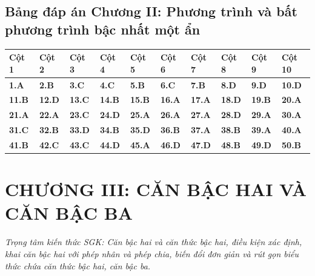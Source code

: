 \documentclass[11pt,a4paper]{article}
\begin{document}
\subsection*{\color{primary} Bảng đáp án Chương II: Phương trình và bất phương trình bậc nhất một ẩn}
\begin{center}
\renewcommand{\arraystretch}{1.25}
\begin{tabularx}{\textwidth}{*{10}{>{\centering\arraybackslash}X}}
\toprule
\textbf{\color{primary} Cột 1} & \textbf{\color{primary} Cột 2} & \textbf{\color{primary} Cột 3} & \textbf{\color{primary} Cột 4} & \textbf{\color{primary} Cột 5} & \textbf{\color{primary} Cột 6} & \textbf{\color{primary} Cột 7} & \textbf{\color{primary} Cột 8} & \textbf{\color{primary} Cột 9} & \textbf{\color{primary} Cột 10} \\
\midrule
\textbf{1.A} & \textbf{2.B} & \textbf{3.C} & \textbf{4.C} & \textbf{5.B} & \textbf{6.C} & \textbf{7.B} & \textbf{8.D} & \textbf{9.D} & \textbf{10.D} \\
\rowcolor{rowtint} \textbf{11.B} & \textbf{12.D} & \textbf{13.C} & \textbf{14.B} & \textbf{15.B} & \textbf{16.A} & \textbf{17.A} & \textbf{18.D} & \textbf{19.B} & \textbf{20.A} \\
\textbf{21.A} & \textbf{22.A} & \textbf{23.C} & \textbf{24.D} & \textbf{25.A} & \textbf{26.A} & \textbf{27.A} & \textbf{28.D} & \textbf{29.A} & \textbf{30.A} \\
\rowcolor{rowtint} \textbf{31.C} & \textbf{32.B} & \textbf{33.D} & \textbf{34.B} & \textbf{35.D} & \textbf{36.B} & \textbf{37.A} & \textbf{38.B} & \textbf{39.A} & \textbf{40.A} \\
\textbf{41.B} & \textbf{42.C} & \textbf{43.C} & \textbf{44.D} & \textbf{45.A} & \textbf{46.D} & \textbf{47.D} & \textbf{48.B} & \textbf{49.D} & \textbf{50.B} \\
\bottomrule
\end{tabularx}
\end{center}\vspace{10pt}
\section*{\color{primary} CHƯƠNG III: CĂN BẬC HAI VÀ CĂN BẬC BA}
\textit{Trọng tâm kiến thức SGK: Căn bậc hai và căn thức bậc hai, điều kiện xác định, khai căn bậc hai với phép nhân và phép chia, biến đổi đơn giản và rút gọn biểu thức chứa căn thức bậc hai, căn bậc ba.}\par\vspace{4pt}
\end{document}
